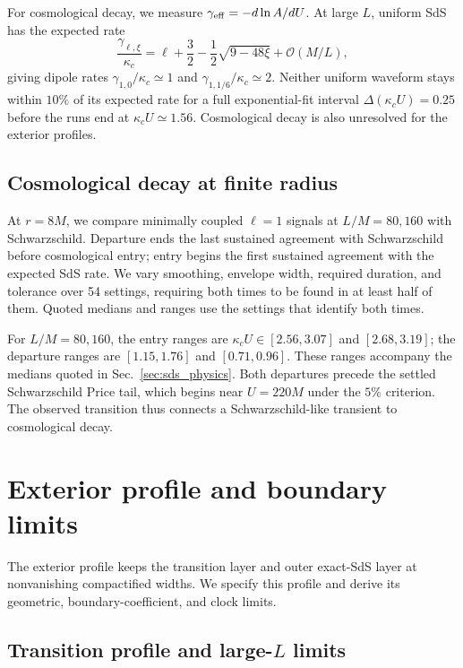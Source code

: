\documentclass[
 aps,
 prd,
 reprint,
 superscriptaddress,
 nofootinbib,
 longbibliography
]{revtex4-2}
\begin{document}
For cosmological decay, we measure $\gamma_{\rm eff}=-d\ln A/dU$.
At large $L$, uniform SdS has the expected rate \cite{brady_radiative_1999}
\begin{equation}
 \frac{\gamma_{\ell,\xi}}{\kappa_c}
 =\ell+\frac32-\frac12\sqrt{9-48\xi}
 +\mathcal O(M/L),
 \label{eq:brady_exponent}
\end{equation}
giving dipole rates $\gamma_{1,0}/\kappa_c\simeq1$ and
$\gamma_{1,1/6}/\kappa_c\simeq2$.  Neither uniform waveform stays within
$10\%$ of its expected rate for a full exponential-fit interval
$\Delta(\kappa_cU)=0.25$ before the runs end at $\kappa_cU\simeq1.56$.
Cosmological decay is also unresolved for the exterior profiles.

\subsection{Cosmological decay at finite radius}
\label{app:finite-radius-crossover}

At $r=8M$, we compare minimally coupled $\ell=1$ signals at $L/M=80,160$
with Schwarzschild. Departure ends the last sustained
agreement with Schwarzschild before cosmological entry; entry begins the
first sustained agreement with the expected SdS rate.  We vary smoothing,
envelope width, required duration, and tolerance
over 54 settings, requiring both times to be found in at least half of them.
Quoted medians and ranges use the settings that identify both times.

For $L/M=80,160$, the entry ranges are $\kappa_cU\in[2.56,3.07]$ and
$[2.68,3.19]$; the departure ranges are $[1.15,1.76]$ and $[0.71,0.96]$.
These ranges accompany the medians quoted in Sec.~\ref{sec:sds_physics}.
Both departures precede the settled Schwarzschild Price tail, which begins
near $U=220M$ under the $5\%$ criterion.  The observed transition thus
connects a Schwarzschild-like transient to cosmological decay.

\section{Exterior profile and boundary limits}
\label{app:exterior-implementation}

The exterior profile keeps the transition layer and outer exact-SdS layer at nonvanishing compactified widths.  We specify this profile and derive its geometric,
boundary-coefficient, and clock limits. 

\subsection{Transition profile and large-\texorpdfstring{$L$}{L} limits}
\end{document}
